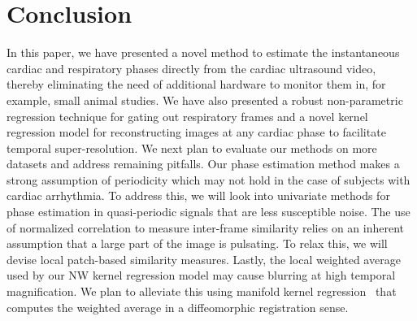 \documentclass[runningheads,a4paper]{llncs}
\begin{document}
\section{Conclusion}
\label{sec:conclusion}
\vspace{-0.2cm}
%
In this paper, we have presented a novel method to estimate the instantaneous cardiac and respiratory phases directly from the cardiac ultrasound video, thereby eliminating the need of additional hardware to monitor them in, for example, small animal studies. We have also presented a robust non-parametric regression technique for gating out respiratory frames and a novel kernel regression model for reconstructing images at any cardiac phase to facilitate temporal super-resolution. We next plan to evaluate our methods on more datasets and address remaining pitfalls. Our phase estimation method makes a strong assumption of periodicity which may not hold in the case of subjects with cardiac arrhythmia. To address this, we will look into univariate methods for phase estimation in quasi-periodic signals that are less susceptible noise. The use of normalized correlation to measure inter-frame similarity relies on an inherent assumption that a large part of the image is pulsating. To relax this, we will devise local patch-based similarity measures. Lastly, the local weighted average used by our NW kernel regression model may cause blurring at high temporal magnification. We plan to alleviate this using manifold kernel regression~\cite{Davis2010} that computes the weighted average in a diffeomorphic registration sense.
%
\vspace{-0.2cm}
%


\end{document}
